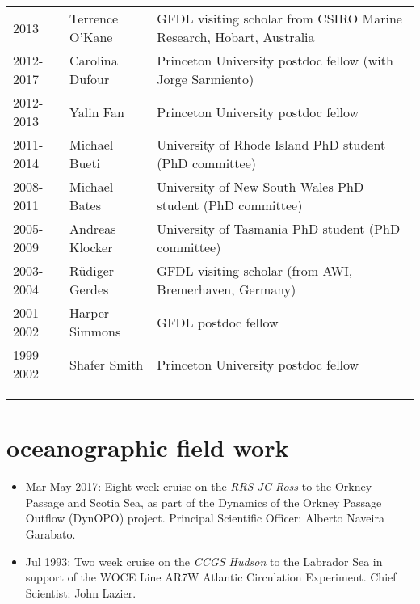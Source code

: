 \documentclass{article}
\begin{document}
\begin{tabular}{lll}
2013               & Terrence O'Kane   & GFDL visiting scholar from CSIRO Marine Research, Hobart, Australia \\

2012-2017     & Carolina Dufour   & Princeton University postdoc fellow (with Jorge Sarmiento)  \\

2012-2013     & Yalin Fan              & Princeton University postdoc fellow  \\

2011-2014     & Michael Bueti       & University of Rhode Island  PhD student (PhD committee) \\

2008-2011     & Michael Bates       & University of New South Wales PhD student (PhD committee) \\

2005-2009     & Andreas Klocker   & University of Tasmania  PhD student (PhD committee) \\

2003-2004     & {R\"{u}diger} Gerdes  & GFDL visiting scholar (from AWI, Bremerhaven, Germany) \\

2001-2002     & Harper Simmons   & GFDL postdoc fellow \\

1999-2002     & Shafer Smith         & Princeton University postdoc fellow    
\end{tabular}


\noindent\rule{\textwidth}{1pt}
\vspace{-1cm}
\section*{\sc \color{Maroon}  oceanographic field work}
\vspace{-.25cm}

\begin{itemize}[leftmargin=*]
 \item 
 Mar-May 2017: Eight week cruise on the {\it RRS JC Ross}  to the Orkney Passage and Scotia Sea,
  as part of the
  Dynamics of the Orkney Passage Outflow (DynOPO) project. Principal Scientific Officer: Alberto Naveira Garabato. 
 \item 
  Jul 1993: Two week cruise on the {\it CCGS Hudson} to the Labrador Sea in support of  the WOCE Line AR7W Atlantic Circulation Experiment. Chief Scientist: John Lazier.
\end{itemize}
\end{document}
